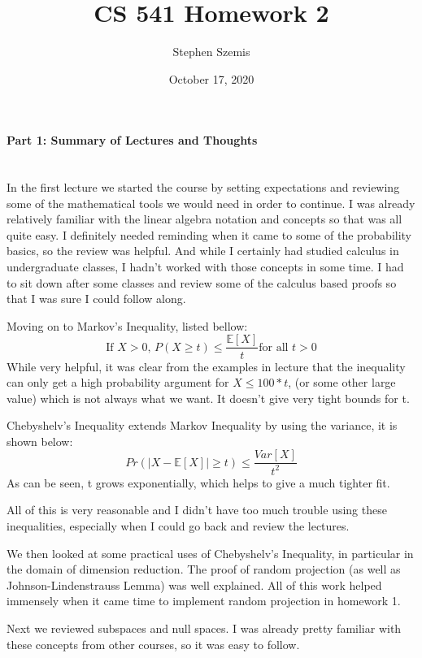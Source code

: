 \documentclass[12pt]{article}
\begin{document}
    \title{CS 541 Homework 2}
    \author{Stephen Szemis}
    \date{October 17, 2020}
    \maketitle

    \paragraph{Part 1: Summary of Lectures and Thoughts}~\\
    \indent In the first lecture we started the course by setting expectations and 
    reviewing some of the mathematical tools we would need in order to continue.
    I was already relatively familiar with the linear algebra notation and concepts 
    so that was all quite easy. I definitely needed reminding when it came to some of 
    the probability basics, so the review was helpful. And while I certainly had studied
    calculus in undergraduate classes, I hadn't worked with those concepts in some time.
    I had to sit down after some classes and review some of the calculus based proofs so that
    I was sure I could follow along.

    Moving on to Markov's Inequality, listed bellow:
    \[
        \text{If } X > 0, \, P(X \ge t) \le \frac{\mathbb{E}[X]}{t} \text{for all } t > 0
    \]
    While very helpful, it was clear from the examples in lecture that the inequality can only 
    get a high probability argument for \(X \le 100 * t \), (or some other large value) which is 
    not always what we want. It doesn't give very tight bounds for t.

    Chebyshelv's Inequality extends Markov Inequality by using the variance, it is shown below:
    \[
        Pr(|X - \mathbb{E}[X] | \ge t) \le \frac{Var[X]}{t^2}
    \]
    As can be seen, t grows exponentially, which helps to give a much tighter fit.

    All of this is very reasonable and I didn't have too much trouble using these inequalities, 
    especially when I could go back and review the lectures.

    We then looked at some practical uses of Chebyshelv's Inequality, in particular in the domain
    of dimension reduction. The proof of random projection (as well as Johnson-Lindenstrauss Lemma) 
    was well explained. All of this work helped immensely when it came time to implement random 
    projection in homework 1.

    Next we reviewed subspaces and null spaces. I was already pretty familiar with these concepts 
    from other courses, so it was easy to follow. 
\end{document}
